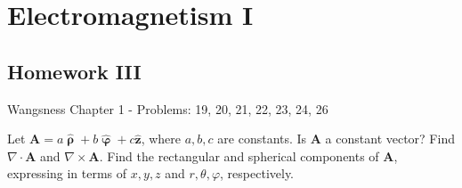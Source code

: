 \documentclass[crop=false,class=article,oneside]{standalone}
\begin{document}
    \ifx\ifphysicscourseselectromagnetismI\undefined
        \section*{Electromagnetism I}
        \setcounter{section}{3}
        \renewcommand\thesubfigure{%
            \arabic{section}.\arabic{figure}.\arabic{subfigure}%
        }
    \fi    
    \subsection{Homework III}
        Wangsness Chapter 1 - Problems: 19, 20, 21, 22, 23, 24, 26
        \begin{problem}[Wangsness 1-19]
            Let
            $\mathbf{A}%
             =a\hat{\boldsymbol{\uprho}}%
             +b\hat{\boldsymbol{\upvarphi}}%
             +c\hat{\mathbf{z}}$,
            where $a,b,c$ are constants. Is $\mathbf{A}$ a
            constant vector? Find $\nabla\cdot\mathbf{A}$ and
            $\nabla\times\mathbf{A}$. Find the rectangular
            and spherical components of $\mathbf{A}$, expressing
            in terms of $x,y,z$ and $r,\theta,\varphi$,
            respectively.
        \end{problem}
\end{document}
